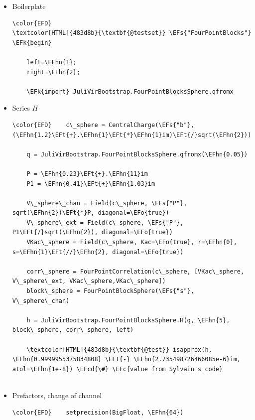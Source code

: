 \documentclass[a4paper]{article}
\numberwithin{equation}{section}
\newcommand{\EFc}[1]{\textcolor{EFc}{#1}} %
\newcommand{\EFcd}[1]{\textcolor{EFcd}{#1}} %
\newcommand{\EFs}[1]{\textcolor{EFs}{#1}} %
\newcommand{\EFk}[1]{\textcolor{EFk}{#1}} %
\newcommand{\EFt}[1]{\textcolor{EFt}{#1}} %
\newcommand{\EFo}[1]{\textcolor{EFo}{#1}} %
\newcommand{\EFhn}[1]{\textcolor{EFhn}{#1}} %
\begin{document}
\begin{itemize}
\item Boilerplate
\label{sec:orgf426b35}

\begin{Code}
\begin{Verbatim}
\color{EFD}
\textcolor[HTML]{483d8b}{\textbf{@testset}} \EFs{"FourPointBlocks"} \EFk{begin}

    left=\EFhn{1};
    right=\EFhn{2};

    \EFk{import} JuliVirBootstrap.FourPointBlocksSphere.qfromx

\end{Verbatim}
\end{Code}
\item Series \(H\)
\label{sec:orgc33bbd2}

\begin{Code}
\begin{Verbatim}
\color{EFD}    c\_sphere = CentralCharge(\EFs{"b"}, (\EFhn{1.2}\EFt{+}.\EFhn{1}\EFt{*}\EFhn{1}im)\EFt{/}sqrt(\EFhn{2}))

    q = JuliVirBootstrap.FourPointBlocksSphere.qfromx(\EFhn{0.05})

    P = \EFhn{0.23}\EFt{+}.\EFhn{11}im
    P1 = \EFhn{0.41}\EFt{+}\EFhn{1.03}im

    V\_sphere\_chan = Field(c\_sphere, \EFs{"P"}, sqrt(\EFhn{2})\EFt{*}P, diagonal=\EFo{true})
    V\_sphere\_ext = Field(c\_sphere, \EFs{"P"}, P1\EFt{/}sqrt(\EFhn{2}), diagonal=\EFo{true})
    VKac\_sphere = Field(c\_sphere, Kac=\EFo{true}, r=\EFhn{0}, s=\EFhn{1}\EFt{//}\EFhn{2}, diagonal=\EFo{true})

    corr\_sphere = FourPointCorrelation(c\_sphere, [VKac\_sphere, V\_sphere\_ext, VKac\_sphere,VKac\_sphere])
    block\_sphere = FourPointBlockSphere(\EFs{"s"}, V\_sphere\_chan)

    h = JuliVirBootstrap.FourPointBlocksSphere.H(q, \EFhn{5}, block\_sphere, corr\_sphere, left)

    \textcolor[HTML]{483d8b}{\textbf{@test}} isapprox(h, \EFhn{0.9999955375834808} \EFt{-} \EFhn{2.735498726466085e-6}im, atol=\EFhn{1e-8}) \EFcd{\#} \EFc{value from Sylvain's code}


\end{Verbatim}
\end{Code}
\item Prefactors, change of channel
\label{sec:orge4395a9}

\begin{Code}
\begin{Verbatim}
\color{EFD}    setprecision(BigFloat, \EFhn{64})


\end{Verbatim}
\end{Code}
\end{itemize}
\end{document}
